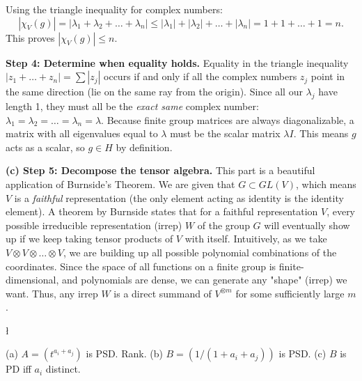 \begin{solution}
Using the triangle inequality for complex numbers:
\[ |\chi_V(g)| = | \lambda_1 + \lambda_2 + \dots + \lambda_n | \leq | \lambda_1 | + | \lambda_2 | + \dots + | \lambda_n | = 1 + 1 + \dots + 1 = n. \]
This proves $|\chi_V(g)| \leq n$.

\textbf{Step 4: Determine when equality holds.}
Equality in the triangle inequality $|z_1 + \dots + z_n| = \sum |z_j|$ occurs if and only if all the complex numbers $z_j$ point in the same direction (lie on the same ray from the origin).
Since all our $\lambda_j$ have length 1, they must all be the \textit{exact same} complex number: $\lambda_1 = \lambda_2 = \dots = \lambda_n = \lambda$.
Because finite group matrices are always diagonalizable, a matrix with all eigenvalues equal to $\lambda$ must be the scalar matrix $\lambda I$.
This means $g$ acts as a scalar, so $g \in H$ by definition.

\textbf{(c) Step 5: Decompose the tensor algebra.}
This part is a beautiful application of Burnside's Theorem. We are given that $G \subset GL(V)$, which means $V$ is a \textit{faithful} representation (the only element acting as identity is the identity element).
A theorem by Burnside states that for a faithful representation $V$, every possible irreducible representation (irrep) $W$ of the group $G$ will eventually show up if we keep taking tensor products of $V$ with itself.
Intuitively, as we take $V \otimes V \otimes \dots \otimes V$, we are building up all possible polynomial combinations of the coordinates. Since the space of all functions on a finite group is finite-dimensional, and polynomials are dense, we can generate any "shape" (irrep) we want.
Thus, any irrep $W$ is a direct summand of $V^{\otimes m}$ for some sufficiently large $m$.
\end{solution}

\begin{exercise}
\l\label{2014:2}

\label{algebra:2014:2}(a) $A = (t^{a_i+a_j})$ is PSD. Rank. (b) $B = (1/(1+a_i+a_j))$ is PSD. (c) $B$ is PD iff $a_i$ distinct.
\end{exercise}

